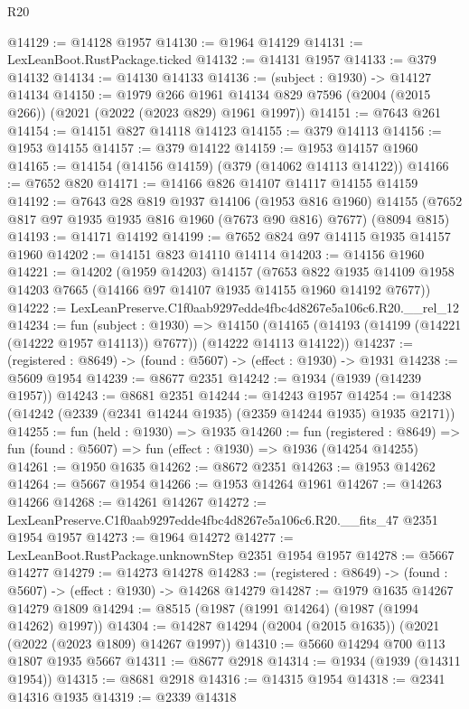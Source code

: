 \begin{lexlean}{R20}
\begin{coremodule}
@14129 := @14128 @1957
@14130 := @1964 @14129
@14131 := LexLeanBoot.RustPackage.ticked
@14132 := @14131 @1957
@14133 := @379 @14132
@14134 := @14130 @14133
@14136 := (subject : @1930) -> @14127 @14134
@14150 := @1979
    @266
    @1961
    @14134
    @829
    @7596
    (@2004 (@2015 @266))
    (@2021 (@2022 (@2023 @829) @1961 @1997))
@14151 := @7643 @261
@14154 := @14151 @827 @14118 @14123
@14155 := @379 @14113
@14156 := @1953 @14155
@14157 := @379 @14122
@14159 := @1953 @14157 @1960
@14165 := @14154 (@14156 @14159) (@379 (@14062 @14113 @14122))
@14166 := @7652 @820
@14171 := @14166 @826 @14107 @14117 @14155 @14159
@14192 := @7643
    @28
    @819
    @1937
    @14106
    (@1953 @816 @1960)
    @14155
    (@7652 @817 @97 @1935 @1935 @816 @1960 (@7673 @90 @816) @7677)
    (@8094 @815)
@14193 := @14171 @14192
@14199 := @7652 @824 @97 @14115 @1935 @14157 @1960
@14202 := @14151 @823 @14110 @14114
@14203 := @14156 @1960
@14221 := @14202
    (@1959 @14203)
    @14157
    (@7653 @822 @1935 @14109 @1958 @14203 @7665 (@14166 @97 @14107 @1935 @14155 @1960 @14192 @7677))
@14222 := LexLeanPreserve.C1f0aab9297edde4fbc4d8267e5a106c6.R20.__rel_12
@14234 := fun (subject : @1930) =>
  @14150 (@14165 (@14193 (@14199 (@14221 (@14222 @1957 @14113)) @7677)) (@14222 @14113 @14122))
@14237 := (registered : @8649) -> (found : @5607) -> (effect : @1930) -> @1931
@14238 := @5609 @1954
@14239 := @8677 @2351
@14242 := @1934 (@1939 (@14239 @1957))
@14243 := @8681 @2351
@14244 := @14243 @1957
@14254 := @14238 (@14242 (@2339 (@2341 @14244 @1935) (@2359 @14244 @1935) @1935 @2171))
@14255 := fun (held : @1930) => @1935
@14260 := fun (registered : @8649) =>
  fun (found : @5607) => fun (effect : @1930) => @1936 (@14254 @14255)
@14261 := @1950 @1635
@14262 := @8672 @2351
@14263 := @1953 @14262
@14264 := @5667 @1954
@14266 := @1953 @14264 @1961
@14267 := @14263 @14266
@14268 := @14261 @14267
@14272 := LexLeanPreserve.C1f0aab9297edde4fbc4d8267e5a106c6.R20.__fits_47 @2351 @1954 @1957
@14273 := @1964 @14272
@14277 := LexLeanBoot.RustPackage.unknownStep @2351 @1954 @1957
@14278 := @5667 @14277
@14279 := @14273 @14278
@14283 := (registered : @8649) -> (found : @5607) -> (effect : @1930) -> @14268 @14279
@14287 := @1979 @1635 @14267 @14279 @1809
@14294 := @8515 (@1987 (@1991 @14264) (@1987 (@1994 @14262) @1997))
@14304 := @14287 @14294 (@2004 (@2015 @1635)) (@2021 (@2022 (@2023 @1809) @14267 @1997))
@14310 := @5660 @14294 @700 @113 @1807 @1935 @5667
@14311 := @8677 @2918
@14314 := @1934 (@1939 (@14311 @1954))
@14315 := @8681 @2918
@14316 := @14315 @1954
@14318 := @2341 @14316 @1935
@14319 := @2339 @14318

\end{coremodule}
\end{lexlean}
